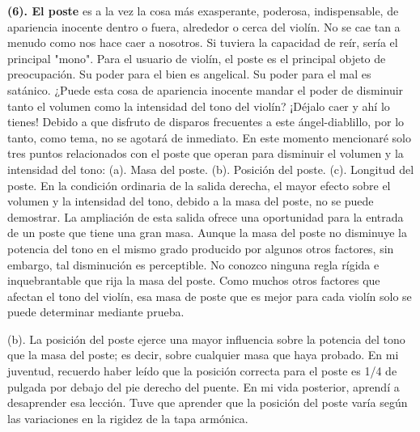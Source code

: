\documentclass[12pt]{book}
\begin{document}
\textbf{(6). El poste} es a la vez la cosa más exasperante, poderosa, indispensable, de apariencia inocente dentro o fuera, alrededor o cerca del violín. No se cae tan a menudo como nos hace caer a nosotros. Si tuviera la capacidad de reír, sería el principal "mono". Para el usuario de violín, el poste es el principal objeto de preocupación. Su poder para el bien es angelical. Su poder para el mal es satánico. ¿Puede esta cosa de apariencia inocente mandar el poder de disminuir tanto el volumen como la intensidad del tono del violín? ¡Déjalo caer y ahí lo tienes! Debido a que disfruto de disparos frecuentes a este ángel-diablillo, por lo tanto, como tema, no se agotará de inmediato. En este momento mencionaré solo tres puntos relacionados con el poste que operan para disminuir el volumen y la intensidad del tono: (a). Masa del poste. (b). Posición del poste. (c). Longitud del poste. En la condición ordinaria de la salida derecha, el mayor efecto sobre el volumen y la intensidad del tono, debido a la masa del poste, no se puede demostrar. La ampliación de esta salida ofrece una oportunidad para la entrada de un poste que tiene una gran masa. Aunque la masa del poste no disminuye la potencia del tono en el mismo grado producido por algunos otros factores, sin embargo, tal disminución es perceptible. No conozco ninguna regla rígida e inquebrantable que rija la masa del poste. Como muchos otros factores que afectan el tono del violín, esa masa de poste que es mejor para cada violín solo se puede determinar mediante prueba.

(b). La posición del poste ejerce una mayor influencia sobre la potencia del tono que la masa del poste; es decir, sobre cualquier masa que haya probado. En mi juventud, recuerdo haber leído que la posición correcta para el poste es 1/4 de pulgada por debajo del pie derecho del puente. En mi vida posterior, aprendí a desaprender esa lección. Tuve que aprender que la posición del poste varía según las variaciones en la rigidez de la tapa armónica.
\end{document}
